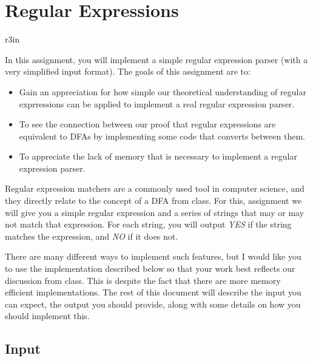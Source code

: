 \documentclass[11pt]{article}
\begin{document}
\section*{Regular Expressions}


\begin{wrapfigure}{r}{3in}
\vspace{-10pt}
\vspace{-30pt}
\end{wrapfigure}

In this assignment, you will implement a simple regular expression parser (with a very simplified input format). The goals of this assignment are to:

\begin{itemize}
	\item Gain an appreciation for how simple our theoretical understanding of regular exprressions can be applied to implement a real regular expression parser.
	\item To see the connection between our proof that regular expressions are equivalent to DFAs by implementing some code that converts between them.
	\item To appreciate the lack of memory that is necessary to implement a regular expression parser.
\end{itemize}

Regular expression matchers are a commonly used tool in computer science, and they directly relate to the concept of a DFA from class. For this, assignment we will give you a simple regular expression and a series of strings that may or may not match that expression. For each string, you will output \emph{YES} if the string matches the expression, and \emph{NO} if it does not.

There are many different ways to implement such features, but I would like you to use the implementation described below so that your work best reflects our discussion from class. This is despite the fact that there are more memory efficient implementations. The rest of this document will describe the input you can expect, the output you should provide, along with some details on how you should implement this.


\subsection*{Input}
\end{document}
